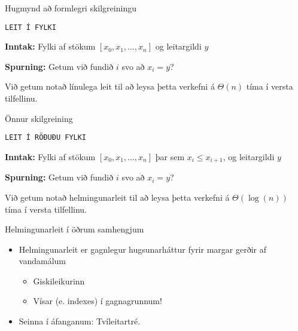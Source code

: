 \documentclass{beamer}
\begin{document}
\begin{frame}{Hugmynd að formlegri skilgreiningu}
\begin{framed}
\texttt{LEIT Í FYLKI}

\textbf{Inntak:} Fylki af stökum $[x_0, x_1, \ldots, x_n]$ og leitargildi $y$

\textbf{Spurning:} Getum við fundið $i$ svo að $x_i = y$?
\end{framed}
Við getum notað línulega leit til að leysa þetta verkefni á $\Theta(n)$ tíma í versta tilfellinu.
\end{frame}

\begin{frame}{Önnur skilgreining}
\begin{framed}
\texttt{LEIT Í RÖÐUÐU FYLKI}

\textbf{Inntak:} Fylki af stökum $[x_0, x_1, \ldots, x_n]$ þar sem $x_i \leq x_{i+1}$, og leitargildi $y$

\textbf{Spurning:} Getum við fundið $i$ svo að $x_i = y$?
\end{framed}
Við getum notað helmingunarleit til að leysa þetta verkefni á $\Theta(\log(n))$ tíma í versta tilfellinu.
\end{frame}

\begin{frame}{Helmingunarleit í öðrum samhengjum}
\begin{itemize}
 \item Helmingunarleit er gagnlegur hugsunarháttur fyrir margar gerðir af vandamálum
 \begin{itemize}
  \item Giskileikurinn
  \item Vísar (e. indexes) í gagnagrunnum!
 \end{itemize}
 \item Seinna í áfanganum: Tvíleitartré.
\end{itemize}
\end{frame}
\end{document}
